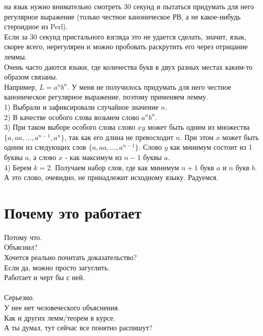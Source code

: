 \documentclass[14pt]{extreport}
\begin{document}
	на язык нужно внимательно смотреть 30 секунд и пытаться придумать для него регулярное
	выражение (только честное каноническое РВ, а не какое-нибудь стероидное из Perl).\\
	Если за 30 секунд пристального взгляда это не удается сделать, значит, язык, скорее
	всего, нерегулярен и можно пробовать раскрутить его через отрицание леммы.\\
	Очень часто даются языки, где количества букв в двух разных местах каким-то образом
	связаны.\\
	Например, $L = a^nb^n$.
	У меня не получилось придумать для него честное каноническое регулярное выражение, поэтому
	применяем лемму.\\
	1) Выбрали и зафиксировали случайное значение $n$.\\
	2) В качестве особого слова возьмем слово $a^nb^n$.\\
	3) При таком выборе особого слова слово $xy$ может быть одним из множества\\
	$\{a, aa,...,a^{n-1},a^n\}$, так как его длина не превосходит $n$. При этом $x$ может быть
	одним из следующих слов $\{a, aa,...,a^{n-1}\}$. Слово $y$ как минимум состоит из
	1 буквы $a$, а слово $x$ - как максимум из $n-1$ буквы $a$.\\
	4) Берем $k=2$. Получаем набор слов, где как минимум $n+1$ букв $a$ и $n$ букв $b$. А это
	слово, очевидно, не принадлежит исходному языку. Радуемся.
	\section{Почему это работает}
	Потому что.\\
	Объяснил?\\
	Хочется реально почитать доказательство?\\
	Если да, можно просто загуглить.\\
	Работает и черт бы с ней.\\\\
	Серьезно.\\
	У нее нет человеческого объяснения.\\
	Как и других лемм/теорем в курсе.\\
	А ты думал, тут сейчас все понятно распишут?\\
	
\end{document}

